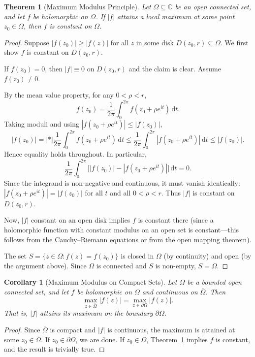 \documentclass[12pt,a4paper,openany]{book}
\theoremstyle{definition}
\theoremstyle{plain}
\newtheorem{theorem}[definition]{Theorem}
\newtheorem{corollary}[definition]{Corollary}
\theoremstyle{remark}
\newcommand{\C}{\mathbb{C}}
\newcommand{\dd}{\mathrm{d}}
\newcommand{\abs}[1]{\left|#1\right|}
\begin{document}
\begin{theorem}[Maximum Modulus Principle]\label{thm:max-modulus}
Let $\Omega\subseteq\C$ be an open connected set, and let $f$ be holomorphic on
$\Omega$. If $\abs{f}$ attains a local maximum at some point $z_0\in\Omega$,
then $f$ is constant on $\Omega$.
\end{theorem}

\begin{proof}
Suppose $\abs{f(z_0)}\ge\abs{f(z)}$ for all $z$ in some disk $D(z_0,r)\subseteq\Omega$.
We first show $f$ is constant on $D(z_0,r)$.

If $f(z_0)=0$, then $\abs{f}\equiv 0$ on $D(z_0,r)$ and the claim is clear.
Assume $f(z_0)\ne 0$.

By the mean value property, for any $0<\rho<r$,
\[
  f(z_0) = \frac{1}{2\pi}\int_0^{2\pi}f(z_0+\rho e^{it})\,\dd t.
\]
Taking moduli and using $\abs{f(z_0+\rho e^{it})}\le\abs{f(z_0)}$,
\[
  \abs{f(z_0)} = \abs*{\frac{1}{2\pi}\int_0^{2\pi}f(z_0+\rho e^{it})\,\dd t}
  \le \frac{1}{2\pi}\int_0^{2\pi}\abs{f(z_0+\rho e^{it})}\,\dd t
  \le \abs{f(z_0)}.
\]
Hence equality holds throughout. In particular,
\[
  \frac{1}{2\pi}\int_0^{2\pi}\bigl[\abs{f(z_0)}-\abs{f(z_0+\rho e^{it})}\bigr]\,\dd t = 0.
\]
Since the integrand is non-negative and continuous, it must vanish identically:
$\abs{f(z_0+\rho e^{it})}=\abs{f(z_0)}$ for all $t$ and all $0<\rho<r$. Thus
$\abs{f}$ is constant on $D(z_0,r)$.

Now, $\abs{f}$ constant on an open disk implies $f$ is constant there (since a
holomorphic function with constant modulus on an open set is constant---this
follows from the Cauchy--Riemann equations or from the open mapping theorem).

The set $S=\{z\in\Omega:f(z)=f(z_0)\}$ is closed in $\Omega$ (by continuity)
and open (by the argument above). Since $\Omega$ is connected and $S$ is
non-empty, $S=\Omega$.
\end{proof}

\begin{corollary}[Maximum Modulus on Compact Sets]\label{cor:max-modulus-boundary}
Let $\Omega$ be a bounded open connected set, and let $f$ be holomorphic on
$\Omega$ and continuous on $\overline{\Omega}$. Then
\[
  \max_{z\in\overline{\Omega}}\abs{f(z)} = \max_{z\in\partial\Omega}\abs{f(z)}.
\]
That is, $\abs{f}$ attains its maximum on the boundary $\partial\Omega$.
\end{corollary}

\begin{proof}
Since $\overline{\Omega}$ is compact and $\abs{f}$ is continuous, the maximum is
attained at some $z_0\in\overline{\Omega}$. If $z_0\in\partial\Omega$, we are
done. If $z_0\in\Omega$, Theorem~\ref{thm:max-modulus} implies $f$ is constant,
and the result is trivially true.
\end{proof}
\end{document}

